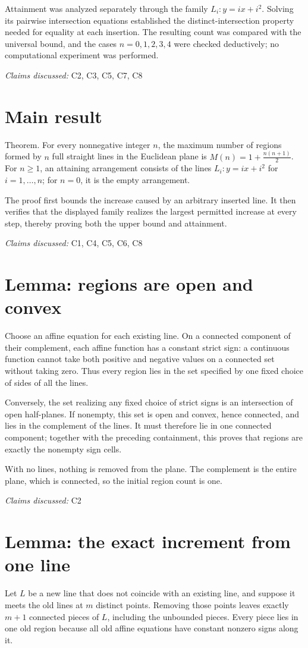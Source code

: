 \documentclass[11pt]{article}
\begin{document}
Attainment was analyzed separately through the family $L_i: y=ix+i^2$. Solving its pairwise intersection equations established the distinct-intersection property needed for equality at each insertion. The resulting count was compared with the universal bound, and the cases $n=0,1,2,3,4$ were checked deductively; no computational experiment was performed.

\textit{Claims discussed: }C2, C3, C5, C7, C8
\section{Main result}
Theorem. For every nonnegative integer $n$, the maximum number of regions formed by $n$ full straight lines in the Euclidean plane is
$M(n)=1+\frac{n(n+1)}{2}$. For $n\geq 1$, an attaining arrangement consists of the lines $L_i: y=ix+i^2$ for $i=1,\ldots,n$; for $n=0$, it is the empty arrangement.

The proof first bounds the increase caused by an arbitrary inserted line. It then verifies that the displayed family realizes the largest permitted increase at every step, thereby proving both the upper bound and attainment.

\textit{Claims discussed: }C1, C4, C5, C6, C8
\section{Lemma: regions are open and convex}
Choose an affine equation for each existing line. On a connected component of their complement, each affine function has a constant strict sign: a continuous function cannot take both positive and negative values on a connected set without taking zero. Thus every region lies in the set specified by one fixed choice of sides of all the lines.

Conversely, the set realizing any fixed choice of strict signs is an intersection of open half-planes. If nonempty, this set is open and convex, hence connected, and lies in the complement of the lines. It must therefore lie in one connected component; together with the preceding containment, this proves that regions are exactly the nonempty sign cells.

With no lines, nothing is removed from the plane. The complement is the entire plane, which is connected, so the initial region count is one.

\textit{Claims discussed: }C2
\section{Lemma: the exact increment from one line}
Let $L$ be a new line that does not coincide with an existing line, and suppose it meets the old lines at $m$ distinct points. Removing those points leaves exactly $m+1$ connected pieces of $L$, including the unbounded pieces. Every piece lies in one old region because all old affine equations have constant nonzero signs along it.
\end{document}
